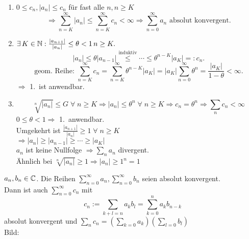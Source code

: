 \documentclass[../ana1.tex]{subfiles}
\begin{document}
\begin{bew}\leavevmode
    \begin{enumerate}
        \item \( 0 \leq c_n, |a_n| \leq c_n \) für fast alle \( n, n\geq K\)
        \[ \Rightarrow \sum_{n=K}^{\infty} |a_n| \leq \sum_{n=K}^\infty c_n < \infty \Rightarrow \sum_{n=0}^\infty a_n \text{ absolut konvergent.} \]
        \item \( \exists \, K\in\mathbb{N}: \frac{|a_{n+1}|}{|a_n|} \leq \theta < 1 \, n\geq K. \)
        \[ |a_n| \leq \theta |a_{n-1}| \overset{\text{induktiv}}{\leq} \cdots \leq \theta^{n-K}|a_K| =: c_n. \]
        \[ \text{geom. Reihe: } \sum_{n=K}^\infty c_n = \sum_{n=K}^\infty \theta^{n-K}|a_K| = |a_K| \sum_{n=0}^\infty \theta^n = \frac{|a_K|}{1-\theta} < \infty. \]
        \( \Rightarrow \) 1.\ ist anwendbar. 
        \item \[ \sqrt[n]{|a_n|} \leq G \;\forall \; n\geq K \Rightarrow |a_n| \leq \theta^n \;\forall \; n\geq K \Rightarrow c_n = \theta^n \Rightarrow \sum_n c_n < \infty \]
        \( 0 \leq \theta < 1 \Rightarrow \) 1.\ anwendbar.\\
        Umgekehrt ist \( \frac{|a_{n+1}|}{|a_n|} \geq 1 \;\forall \; n\geq K \) \\
        \( \Rightarrow |a_n| \geq |a_{n-1}| \geq \cdots \geq |a_K| \) \\
        \( a_n \) ist keine Nullfolge \( \Rightarrow \sum_n a_n \) divergent.\\
        Ähnlich bei \( \sqrt[n]{|a_n|} \geq 1 \Rightarrow |a_n| \geq 1^n = 1 \)
    \end{enumerate}
\end{bew}
\begin{satz}[Cauchyprodukt]
    \( a_n, b_n \in\mathbb{C} \). Die Reihen \( \sum_{n=0}^\infty a_n, \sum_{n=0}^\infty b_n \) seien absolut konvergent.\\
    Dann ist auch \( \sum_{n=0}^\infty c_n \) mit 
    \[ c_n := \sum_{k+l=n} a_k b_l = \sum_{k=0}^n a_k b_{n-k} \]
    absolut konvergent und \( \sum_n c_n = ( \sum_{k=0} a_k )( \sum_{l=0} b_l ) \) \\
    Bild:\\
    \begin{center}
    \end{center}
\end{satz}
\end{document}
